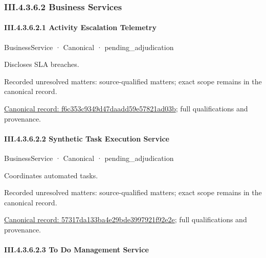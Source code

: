 \subsubsection*{III.4.3.6.2 Business Services}
\label{navigation:III.4.3.6.2}

\paragraph*{III.4.3.6.2.1 Activity Escalation Telemetry}
\label{navigation:III.4.3.6.2.1}

\label{element:f6c353c9349d47daadd59e57821ad03b}
{\small BusinessService · Canonical · pending\_adjudication}\par

Discloses SLA breaches.


{\small Recorded unresolved matters: source-qualified matters; exact scope remains in the canonical record.}\par
{\footnotesize \href{../../../../continuum/business/business-service/f6c353c9349d47daadd59e57821ad03b.md}{Canonical record: f6c353c9349d47daadd59e57821ad03b}; full qualifications and provenance.}\par
\paragraph*{III.4.3.6.2.2 Synthetic Task Execution Service}
\label{navigation:III.4.3.6.2.2}

\label{element:57317da133ba4e29bde3997921f92e2e}
{\small BusinessService · Canonical · pending\_adjudication}\par

Coordinates automated tasks.


{\small Recorded unresolved matters: source-qualified matters; exact scope remains in the canonical record.}\par
{\footnotesize \href{../../../../continuum/business/business-service/57317da133ba4e29bde3997921f92e2e.md}{Canonical record: 57317da133ba4e29bde3997921f92e2e}; full qualifications and provenance.}\par
\paragraph*{III.4.3.6.2.3 To Do Management Service}
\label{navigation:III.4.3.6.2.3}


